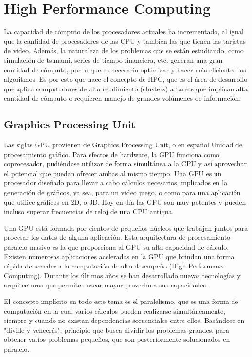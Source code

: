 \section{High Performance Computing}

La capacidad de cómputo de los procesadores actuales ha incrementado, al igual que la cantidad de procesadores de las CPU y también las que tienen las tarjetas de video. Además, la
naturaleza de los problemas que se están estudiando, como simulación de tsunami, series de tiempo financiera, etc. generan una gran cantidad de cómputo, por lo que es
necesario optimizar y hacer más eficientes los algoritmos. Es por esto que nace el concepto de HPC, que es el área de desarrollo que aplica computadores de alto rendimiento 
(clusters) a tareas que implican alta cantidad de cómputo o requieren manejo de grandes volúmenes de información. 

\subsection{Graphics Processing Unit}
Las siglas GPU provienen de Graphics Processing Unit, o en español Unidad de procesamiento gráfico. Para efectos de hardware, la GPU funciona como coprocesador,
pudiéndose utilizar de forma simultánea a la CPU y así aprovechar el potencial que puedan ofrecer ambas al mismo tiempo. Una GPU es un procesador
diseñado para llevar a cabo cálculos necesarios implicados en la generación de gráficos, ya sea, para un video juego, o como para una aplicación que utilice
gráficos en 2D, o 3D. Hoy en día las GPU son muy potentes y pueden incluso superar frecuencias de reloj de una CPU antigua.

Una GPU está formada por cientos de pequeños núcleos que trabajan juntos para procesar los datos de alguna aplicación. Esta arquitectura de procesamiento paralelo
masivo es la que proporciona al GPU su alta capacidad de cálculo. Existen numerosas aplicaciones aceleradas en la GPU que brindan una forma rápida de acceder
a la computación de alto desempeño (High Performance Computing). Durante los últimos años se han desarrollado nuevas tecnologías y arquitecturas
que permiten sacar mayor provecho a sus capacidades \cite{owens2007gpu}.

El concepto implícito en todo este tema es el paralelismo, que es una forma de computación en la cual varios cálculos pueden realizarse simultáneamente,
siempre y cuando no existan dependencias secuenciales entre ellos. Basándose en "divide y vencerás", principio que busca dividir los problemas grandes, para
obtener varios problemas pequeños, que son posteriormente solucionados en paralelo.

